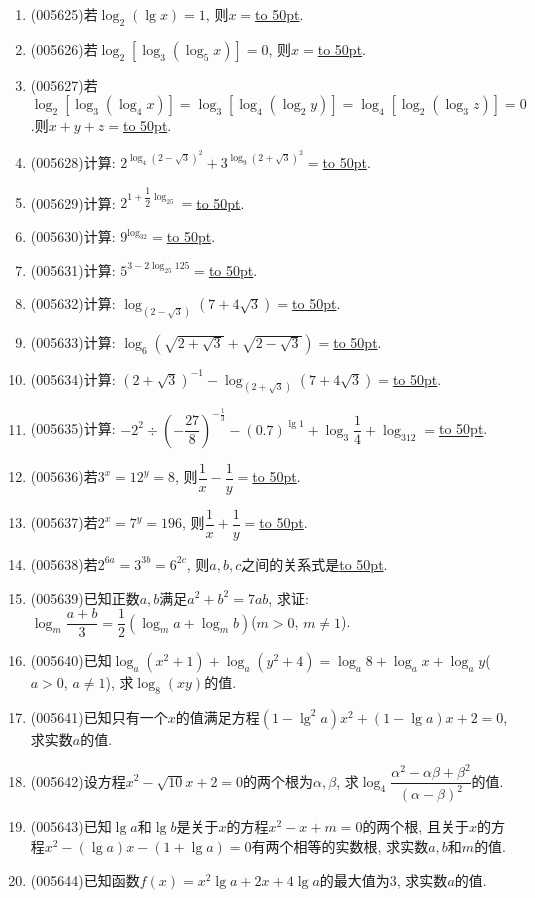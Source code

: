 \documentclass[10pt,a4paper]{article}
\newcommand{\blank}[1]{\underline{\hbox to #1pt{}}}
\begin{document}
\begin{enumerate}[1.]
\item {\tiny (005625)}若$\log_2(\lg x)=1$, 则$x=$\blank{50}.
\item {\tiny (005626)}若$\log_2[\log_3(\log_5x)]=0$, 则$x=$\blank{50}.
\item {\tiny (005627)}若$\log_2[\log_3(\log_4x)]=\log_3[\log_4(\log_2y)]=\log_4[\log_2(\log_3z)]=0$.则$x+y+z=$\blank{50}.
\item {\tiny (005628)}计算: $2^{\log_4(2-\sqrt 3)^2}+3^{\log_9(2+\sqrt 3)^2}=$\blank{50}.
\item {\tiny (005629)}计算: $2^{1+\dfrac 12\log_25}=$\blank{50}.
\item {\tiny (005630)}计算: $9^{\log_32}=$\blank{50}.
\item {\tiny (005631)}计算: $5^{3-2\log_{25}125}=$\blank{50}.
\item {\tiny (005632)}计算: $\log_{(2-\sqrt 3)}(7+4\sqrt 3)=$\blank{50}.
\item {\tiny (005633)}计算: $\log_6(\sqrt {2+\sqrt 3}+\sqrt {2-\sqrt 3})=$\blank{50}.
\item {\tiny (005634)}计算: $(2+\sqrt 3)^{-1}-\log_{(2+\sqrt 3)}(7+4\sqrt 3)=$\blank{50}.
\item {\tiny (005635)}计算: $-2^2\div (-\dfrac{27}8)^{-\frac 13}-(0.7)^{\lg 1}+\log_3\dfrac 14+\log_312=$\blank{50}.
\item {\tiny (005636)}若$3^x=12^y=8$, 则$\dfrac 1x-\dfrac 1y=$\blank{50}.
\item {\tiny (005637)}若$2^x=7^y=196$, 则$\dfrac 1x+\dfrac 1y=$\blank{50}.
\item {\tiny (005638)}若$2^{6a}=3^{3b}=6^{2c}$, 则$a,b,c$之间的关系式是\blank{50}.
\item {\tiny (005639)}已知正数$a,b$满足$a^2+b^2=7ab$, 求证: $\log_m\dfrac{a+b}3=\dfrac 12(\log_ma+\log_mb)$($m>0$, $m\ne 1$).
\item {\tiny (005640)}已知$\log_a(x^2+1)+\log_a(y^2+4)=\log_a8+\log_ax+\log_ay$($a>0$, $a\ne 1$), 求$\log_8(xy)$的值.
\item {\tiny (005641)}已知只有一个$x$的值满足方程$(1-\lg ^2a)x^2+(1-\lg a)x+2=0$, 求实数$a$的值.
\item {\tiny (005642)}设方程$x^2-\sqrt {10}x+2=0$的两个根为$\alpha ,\beta$, 求$\log_4\dfrac{\alpha ^2-\alpha \beta +\beta ^2}{(\alpha -\beta)^2}$的值.
\item {\tiny (005643)}已知$\lg a$和$\lg b$是关于$x$的方程$x^2-x+m=0$的两个根, 且关于$x$的方程$x^2-(\lg a)x-(1+\lg a)=0$有两个相等的实数根, 求实数$a,b$和$m$的值.
\item {\tiny (005644)}已知函数$f(x)=x^2\lg a+2x+4\lg a$的最大值为3, 求实数$a$的值.

\end{enumerate}
\end{document}
